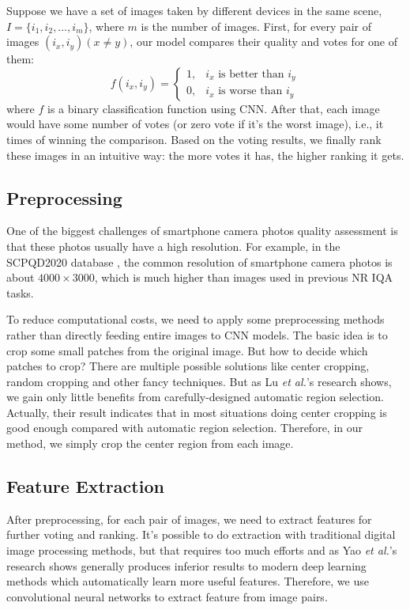 \documentclass[journal]{IEEEtran}
\begin{document}
Suppose we have a set of images taken by different devices in the same scene, $I = \{i_1, i_2, \dots, i_m\}$, where $m$ is the number of images. First, for every pair of images $(i_x, i_y) (x \neq y)$, our model compares their quality and votes for one of them:
\begin{equation}
    f(i_x, i_y) = \begin{cases}
    1, & i_x \text{ is better than } i_y\\
    0, & i_x \text{ is worse than } i_y
    \end{cases}
\end{equation}
where $f$ is a binary classification function using CNN.
After that, each image would have some number of votes (or zero vote if it's the worst image), i.e., it times of winning the comparison. Based on the voting results, we finally rank these images in an intuitive way: the more votes it has, the higher ranking it gets.

\subsection{Preprocessing}
One of the biggest challenges of smartphone camera photos quality assessment is that these photos usually have a high resolution. For example, in the SCPQD2020 database \cite{9191104}, the common resolution of smartphone camera photos is about $4000 \times 3000$, which is much higher than images used in previous NR IQA tasks.

To reduce computational costs, we need to apply some preprocessing methods rather than directly feeding entire images to CNN models. The basic idea is to crop some small patches from the original image. But how to decide which patches to crop? There are multiple possible solutions like center cropping, random cropping and other fancy techniques. But as Lu \textit{et al.}'s research \cite{9190832} shows, we gain only little benefits from carefully-designed automatic region selection. Actually, their result indicates that in most situations doing center cropping is good enough compared with automatic region selection. Therefore, in our method, we simply crop the center region from each image.

\subsection{Feature Extraction}
After preprocessing, for each pair of images, we need to extract features for further voting and ranking. It's possible to do extraction with traditional digital image processing methods, but that requires too much efforts and as Yao \textit{et al.}'s research \cite{yao2020convolutional} shows generally produces inferior results to modern deep learning methods which automatically learn more useful features. Therefore, we use convolutional neural networks to extract feature from image pairs.
\end{document}
